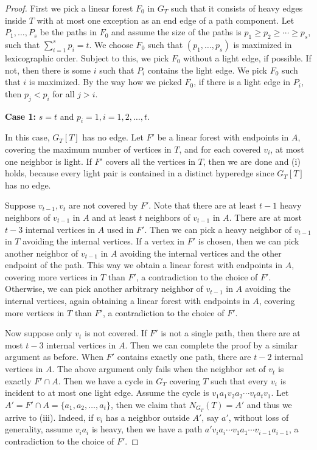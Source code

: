 \documentclass[10pt,a4paper]{amsart}
\begin{document}
\begin{proof}
    
    First we pick a linear forest $F_0$ in $G_T$ such that it consists of heavy edges inside $T$ with at most one exception as an end edge of a path component.
    Let $P_1,\dots, P_s$ be the paths in $F_0$ and assume the size of the paths is $p_1 \ge p_2 \ge \cdots \ge p_s$, such that $\sum_{i=1}^{s}p_i = t$.
    We choose $F_0$ such that $(p_1,\ldots,p_s)$ is maximized in lexicographic order.
    Subject to this, we pick $F_0$ without a light edge, if possible. If not, then there is some $i$ such that $P_i$ contains the light edge. We pick $F_0$ such that $i$ is maximized.
By the way how we picked $F_0$, if there is a light edge in $P_i$, then $p_j < p_i$ for all $j > i$.

    \noindent
    \textbf{Case 1:} $s = t$ and $p_i = 1, i=1,2,\ldots,t$.
    
    In this case, $G_T[T]$ has no edge.
    Let $F'$ be a linear forest with endpoints in $A$, covering the maximum number of vertices in $T$, and for each covered $v_i$, at most one neighbor is light.
    If $F'$ covers all the vertices in $T$, then we are done and (i) holds, because every light pair is contained in a distinct hyperedge since $G_T[T]$ has no edge.
    
    Suppose $v_{t-1}, v_{t}$ are not covered by $F'$.
    Note that there are at least $t-1$ heavy neighbors of $v_{t-1}$ in $A$ and at least $t$ neighbors of $v_{t-1}$ in $A$.
    There are at most $t-3$ internal vertices in $A$ used in $F'$. Then we can pick a heavy neighbor of $v_{t-1}$ in $T$ avoiding the internal vertices.
    If a vertex in $F'$ is chosen, then we can pick another neighbor of $v_{t-1}$ in $A$ avoiding the internal vertices and the other endpoint of the path. This way we obtain a linear forest with endpoints in $A$, covering more vertices in $T$ than $F'$, a contradiction to the choice of $F'$.
    Otherwise, we can pick another arbitrary neighbor of $v_{t-1}$ in $A$ avoiding the internal vertices, again obtaining a linear forest with endpoints in $A$, covering more vertices in $T$ than $F'$, a contradiction to the choice of $F'$.

    Now suppose only $v_t$ is not covered.
    If $F'$ is not a single path, then there are at most $t-3$ internal vertices in $A$.
    Then we can complete the proof by a similar argument as before.
    When $F'$ contains exactly one path, there are $t-2$ internal vertices in $A$.
    The above argument only fails when the neighbor set of $v_t$ is exactly $F'\cap A$.
    Then we have a cycle in $G_T$ covering $T$ such that every $v_i$ is incident to at most one light edge.
    Assume the cycle is $v_1a_1v_2a_2\cdots v_ta_tv_1$.
    Let $A' = F' \cap A = \{a_1,a_2,\ldots,a_t\}$, then we claim that $N_{G_T}(T) = A'$ and thus we arrive to (iii). Indeed, if $v_i$ has a neighbor outside $A'$, say $a'$, without loss of generality, assume $v_ia_i$ is heavy, then we have a path $a'v_ia_i\cdots v_1a_1 \cdots v_{i-1}a_{i-1}$, a contradiction to the choice of $F'$.


\end{proof}
\end{document}

